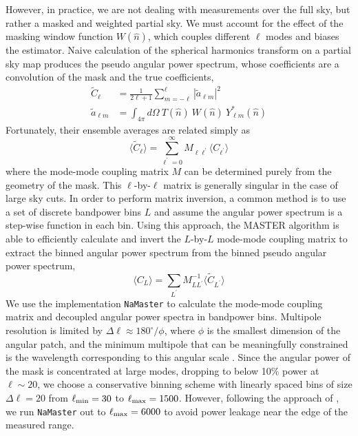 However, in practice, we are not dealing with measurements over the full sky, but rather a masked and weighted partial sky. We must account for the effect of the masking window function $W(\hat{n})$, which couples different $\ell$ modes and biases the estimator. Naive calculation of the spherical harmonics transform on a partial sky map produces the pseudo angular power spectrum, whose coefficients are a convolution of the mask and the true coefficients,
\begin{align}
    \tilde{C}_{\ell} &= \frac{1}{2\ell + 1}\sum_{m=-\ell}^{\ell} |\tilde{a}_{\ell m}|^2 \\
    \tilde{a}_{\ell m} &= \int_{4\pi}d\Omega \ T(\hat{n}) \ W(\hat{n}) \ Y^{*}_{\ell m}(\hat{n}) %
\end{align}
Fortunately, their ensemble averages are related simply as
\begin{equation}
    \langle \tilde{C}_{\ell} \rangle = \sum_{\ell^{\prime}=0}^{\infty} M_{\ell \ell^{\prime}} \langle C_{\ell^{\prime}} \rangle
\end{equation}
where the mode-mode coupling matrix $M$ can be determined purely from the geometry of the mask.
This $\ell$-by-$\ell$ matrix is generally singular in the case of large sky cuts. In order to perform matrix inversion, a common method is to use a set of discrete bandpower bins $L$ and assume the angular power spectrum is a step-wise function in each bin. Using this approach, the MASTER algorithm \citep{MASTER} is able to efficiently calculate and invert the $L$-by-$L$ mode-mode coupling matrix to extract the binned angular power spectrum from the binned pseudo angular power spectrum,
%
\begin{equation}
    \langle C_{L} \rangle = \sum_{L^{\prime}} M_{L L^{\prime}}^{-1} \langle \tilde{C}_{L^{\prime}} \rangle
\end{equation}
We use the implementation \texttt{NaMaster} \citep{Alonso++19} to calculate the mode-mode coupling matrix and decoupled angular power spectra in bandpower bins. Multipole resolution is limited by $\Delta \ell \approx 180^{\circ} / \phi$, where $\phi$ is the smallest dimension of the angular patch, and the minimum multipole that can be meaningfully constrained is the wavelength corresponding to this angular scale \citep{Peebles80}. Since the angular power of the mask is concentrated at large modes, dropping to below 10\% power at $\ell \sim 20$, we choose a conservative binning scheme with linearly spaced bins of size $\Delta \ell = 20$ from $\ell_{\rm min} = 30$ to $\ell_{\rm max} = 1500$. However, following the approach of \cite{Krolewski19}, we run \texttt{NaMaster} out to $\ell_{\rm max} = 6000$ to avoid power leakage near the edge of the measured range.

